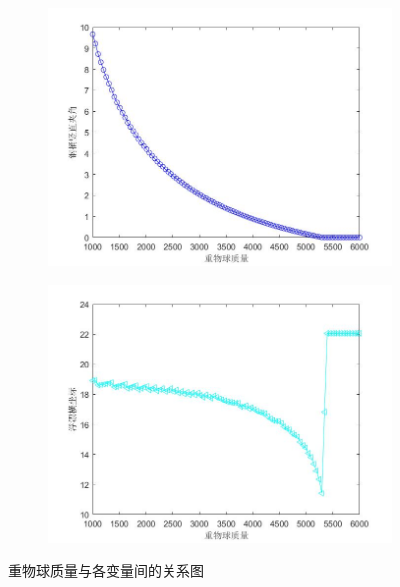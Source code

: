 \documentclass[UTF8]{ctexbook}
\theoremstyle{nonumberplain}
\begin{document}
\begin{figure}[H]
\begin{subfigure}[b]{0.4\textwidth}
                    \caption{}
                    \label{fig:锚链底端水平夹角随重物球质量变化曲线}
                \end{subfigure}
                \centering
                \begin{subfigure}[b]{0.4\textwidth}
                    \includegraphics[width=\textwidth]{images/alpha1_m+.jpg}
                    \caption{}
                    \label{fig:钢桶竖直夹角随重物球质量变化曲线}
                \end{subfigure}
                \begin{subfigure}[b]{0.4\textwidth}
                    \includegraphics[width=\textwidth]{images/x0_m+.jpg}
                    \caption{}
                    \label{fig:浮漂横坐标随重物球质量变化曲线}
                \end{subfigure}
                \caption{重物球质量与各变量间的关系图}
                \label{重物球质量与各变量间的关系图}
            \end{figure}
\end{document}
